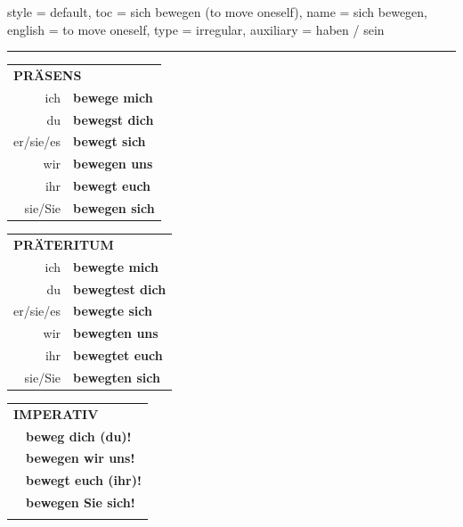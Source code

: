 \begin{verbentry}{
  style = {default},
  toc = {sich bewegen (to move oneself)},
  name = {sich bewegen},
  english = {to move oneself},
  type = {irregular},
  auxiliary = {haben / sein}
}
 
    
     \vspace{5pt}
    \hrule
    \vspace{5pt}

  \begin{tabular}{rl}
     \multicolumn{2}{l}{\textbf{PRÄSENS} }\\
    ich & \textbf{bewege mich}\\
    du & \textbf{bewegst dich}\\
    er/sie/es & \textbf{bewegt sich}\\
    wir & \textbf{bewegen uns}\\
    ihr & \textbf{bewegt euch}\\
    sie/Sie & \textbf{bewegen sich}\\
  \end{tabular}
  \hfill
     \begin{tabular}{rl}
    \multicolumn{2}{l}{\textbf{PRÄTERITUM} }\\
    ich & \textbf{bewegte mich}\\
    du & \textbf{bewegtest dich}\\
    er/sie/es & \textbf{bewegte sich}\\
    wir & \textbf{bewegten uns}\\
    ihr & \textbf{bewegtet euch}\\
    sie/Sie & \textbf{bewegten sich}\\
  \end{tabular}
  \hfill
  \begin{tabular}{rl}
     \multicolumn{2}{l}{\textbf{IMPERATIV} }\\
   & \textbf{beweg dich (du)!}\\
   & \textbf{bewegen wir uns!}\\
   & \textbf{bewegt euch (ihr)!}\\
   & \textbf{bewegen Sie sich!}\\
   & \vspace{10pt}
  \end{tabular}

 \vspace{10pt}


\end{verbentry}
